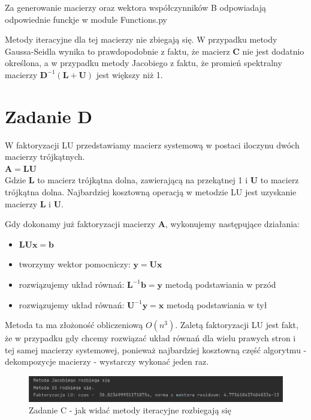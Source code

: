 \documentclass[fleqn]{article}
\begin{document}
    \noindent Za generowanie macierzy oraz wektora współczynników B odpowiadają
    odpowiednie funckje w module Functions.py

    \noindent Metody iteracyjne dla tej macierzy nie zbiegają się. W przypadku metody Gaussa-Seidla wynika
    to prawdopodobnie z faktu, że macierz \textbf{C} nie jest dodatnio określona, a w przypadku metody
    Jacobiego z faktu, że promień spektralny macierzy $\bm{D}^{-1}(\bm{L} + \bm{U})$ jest większy niż 1.

    \newpage
    \section{Zadanie D}
    W faktoryzacji LU przedstawiamy macierz systemową w postaci iloczynu dwóch macierzy trójkątnych. \\

    $\bm{A} = \bm{L}\bm{U}$ \\

    \noindent Gdzie \textbf{L} to macierz trójkątna dolna, zawierającą na przekątnej 1 i \textbf{U} to macierz trójkątna dolna.
    Najbardziej kosztowną operacją w metodzie LU jest uzyskanie macierzy \textbf{L} i \textbf{U}.

    \noindent Gdy dokonamy już faktoryzacji macierzy \textbf{A}, wykonujemy następujące działania:
    \begin{itemize}
        \item $\bm{L}\bm{U}\bm{x} = \bm{b}$
        \item tworzymy wektor pomocniczy: $\bm{y} = \bm{U}\bm{x}$
        \item rozwiązujemy układ równań: $\bm{L}^{-1}\bm{b} = \bm{y}$ metodą podstawiania w przód
        \item rozwiązujemy układ równań: $\bm{U}^{-1}\bm{y} = \bm{x}$ metodą podstawiania w tył
    \end{itemize}

    \noindent Metoda ta ma złożoność obliczeniową $O(n^3)$. Zaletą faktoryzacji LU jest fakt, 
    że w przypadku gdy chcemy rozwiązać układ równań dla wielu prawych stron i tej samej macierzy 
    systemowej, ponieważ najbardziej kosztowną część algorytmu - dekompozycje macierzy - wystarczy 
    wykonać jeden raz.

    \begin{figure}[h]

        \centering
        \includegraphics[width=\textwidth]{LU.png}
        \centering
        \caption{Zadanie C - jak widać metody iteracyjne rozbiegają się}

    \end{figure}
\end{document}
